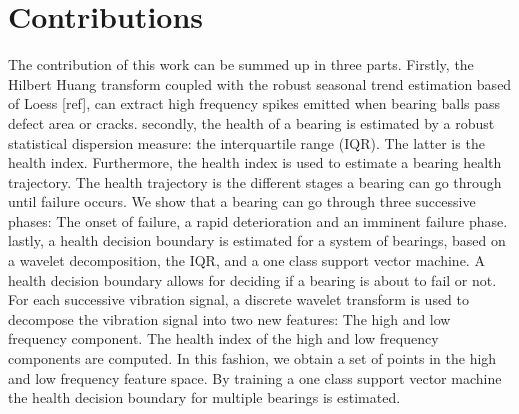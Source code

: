 \documentclass[../Main/thesis.tex]{subfiles}
\begin{document}
\section{Contributions }
\label{sec:contributions}
The contribution of this work can be summed up in three parts. Firstly, the Hilbert Huang transform coupled with the robust seasonal trend estimation based of Loess [ref], can extract high frequency spikes emitted when bearing balls pass defect area or cracks.
\justify
secondly, the health of a bearing is estimated by a robust statistical dispersion measure: the interquartile range (IQR). The latter is the health index. Furthermore,  the health index is used to estimate a bearing health trajectory. The health trajectory is the different stages a bearing can go through until failure occurs. We show that a bearing can go through three successive phases: The onset of failure, a rapid deterioration and an imminent failure phase. 
\justify
lastly, a health decision boundary is estimated for a system of bearings, based on a wavelet decomposition, the IQR, and a one class support vector machine. A health decision boundary allows for deciding if a bearing is about to fail or not. For each successive vibration signal, a discrete wavelet transform is used to decompose the vibration signal into two new features: The high and low frequency component. The health index of the high and low frequency components are computed. In this fashion, we obtain a set of points in the high and low frequency feature space. By training a one class support vector machine the health decision boundary for multiple bearings is estimated.


\blankpage
\end{document}
